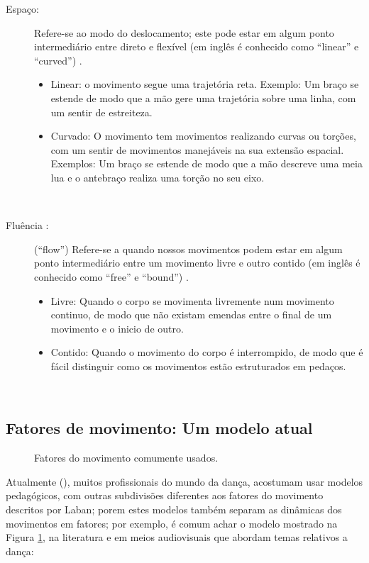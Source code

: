 \begin{description}
\item[Espaço:] Refere-se ao modo do deslocamento;
este pode estar em algum ponto intermediário entre  direto  e  flexível 
(em inglês é conhecido como  ``linear'' e ``curved'') 
\cite[pp. 143]{laban1987dominio} \cite[pp. 6]{carline2011lesson} \cite[pp. 28]{elementosdanca2017}.
\begin{itemize}
\item Linear: o movimento segue uma trajetória reta. Exemplo:
Um braço se estende de modo que a mão gere uma trajetória sobre uma linha,
com um sentir de estreiteza.
\item Curvado: O movimento tem movimentos realizando curvas ou torções,
com um sentir de movimentos manejáveis na sua extensão espacial. 
Exemplos: Um braço se estende de modo que a mão descreve uma meia lua e o antebraço realiza uma torção no seu eixo.
\end{itemize}~
\item[Fluência :] (``flow'') Refere-se a quando nossos movimentos podem 
estar em algum ponto intermediário entre um movimento livre  e outro contido 
(em inglês é conhecido como   ``free'' e ``bound'')
\cite[pp. 140-143]{laban1987dominio} \cite[pp. 6]{carline2011lesson} \cite[pp. 27]{elementosdanca2017}.
\begin{itemize}
\item Livre: Quando o corpo se movimenta livremente num movimento continuo,
de modo que não existam emendas entre o final de um movimento e o inicio de outro.
\item Contido: Quando o movimento do corpo é interrompido,
de modo que é fácil distinguir como os movimentos estão estruturados em pedaços.
\end{itemize}~
\end{description}

\subsection{Fatores de movimento: Um modelo atual}
\label{subsec:fator:movimento:atual}
\begin{figure}
\centering
{} 
\caption{Fatores do movimento comumente usados.}
\label{fig:fatores:moviemnto:popular}
\end{figure}
Atualmente (\AnoLivro), muitos profissionais do mundo da dança, 
 acostumam usar modelos pedagógicos, 
com outras subdivisões diferentes aos fatores do movimento descritos por Laban; 
porem estes modelos também separam as dinâmicas dos movimentos em fatores;
por exemplo, é comum achar o modelo  mostrado na Figura \ref{fig:fatores:moviemnto:popular},
na literatura \cite[pp. 30]{paine2014complete} \cite[pp. 181]{smith2014dance}
e em meios audiovisuais que abordam temas relativos a dança:

